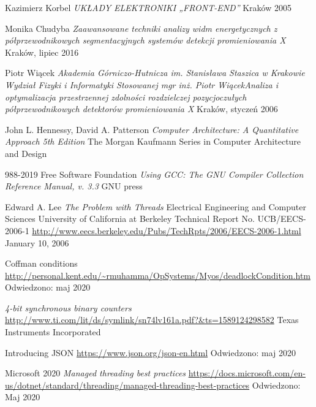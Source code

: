 \listoffigures
\listoftables

\newpage

\begin{thebibliography}{99}
        Kazimierz Korbel \textit{UKŁADY ELEKTRONIKI „FRONT-END”}
        Kraków 2005

        Monika Chudyba
        \textit{
        Zaawansowane techniki analizy widm energetycznych z półprzewodnikowych segmentacyjnych systemów detekcji promieniowania X }
        Kraków, lipiec 2016

        Piotr Wiącek
        \textit{Akademia Górniczo-Hutnicza im. Stanisława Staszica w Krakowie Wydział Fizyki i Informatyki Stosowanej mgr inż. Piotr WiącekAnaliza i optymalizacja przestrzennej zdolności rozdzielczej pozycjoczułych półprzewodnikowych detektorów promieniowania X}
        Kraków, styczeń 2006

        John L. Hennessy, David A. Patterson 
        \textit{Computer Architecture: A Quantitative Approach  5th Edition }
        The Morgan Kaufmann Series in Computer Architecture and Design

        988-2019 Free Software Foundation
        \textit{Using GCC: The GNU Compiler Collection Reference Manual, v. 3.3}
        GNU press

        Edward A. Lee
        \textit{The Problem with Threads}
        Electrical Engineering and Computer Sciences
        University of California at Berkeley
        Technical Report No. UCB/EECS-2006-1
        \url{http://www.eecs.berkeley.edu/Pubs/TechRpts/2006/EECS-2006-1.html}
        January 10, 2006

        Coffman conditions
        \url{http://personal.kent.edu/~rmuhamma/OpSystems/Myos/deadlockCondition.htm}
        Odwiedzono: maj 2020

        \textit{4-bit synchronous binary counters}
        \url{http://www.ti.com/lit/ds/symlink/sn74lv161a.pdf?&ts=1589124298582}
        Texas Instruments Incorporated
        

        Introducing JSON
        \url{https://www.json.org/json-en.html}
        Odwiedzono: maj 2020

        Microsoft 2020
        \textit{Managed threading best practices}
        \url{https://docs.microsoft.com/en-us/dotnet/standard/threading/managed-threading-best-practices}
        Odwiedzono: Maj 2020
        

\end{thebibliography}
